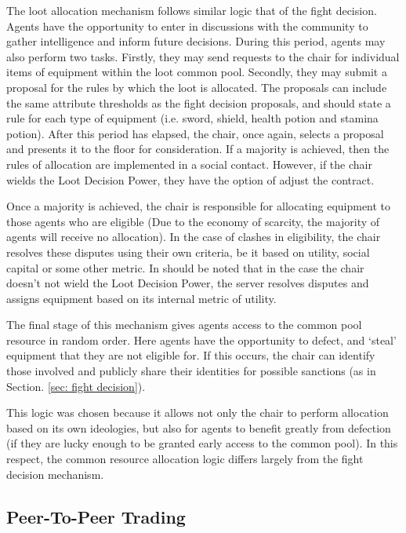 % 
The loot allocation mechanism follows similar logic that of the fight decision. Agents have the opportunity to enter in discussions with the community to gather intelligence and inform future decisions. During this period, agents may also perform two tasks. Firstly, they may send requests to the chair for individual items of equipment within the loot common pool. Secondly, they may submit a proposal for the rules by which the loot is allocated. The proposals can include the same attribute thresholds as the fight decision proposals, and should state a rule for each type of equipment (i.e. sword, shield, health potion and stamina potion). After this period has elapsed, the chair, once again, selects a proposal and presents it to the floor for consideration. If a majority is achieved, then the rules of allocation are implemented in a social contact. However, if the chair wields the Loot Decision Power, they have the option of adjust the contract. 

Once a majority is achieved, the chair is responsible for allocating equipment to those agents who are eligible (Due to the economy of scarcity, the majority of agents will receive no allocation). In the case of clashes in eligibility, the chair resolves these disputes using their own criteria, be it based on utility, social capital or some other metric. In should be noted that in the case the chair doesn't not wield the Loot Decision Power, the server resolves disputes and assigns equipment based on its internal metric of utility. 

The final stage of this mechanism gives agents access to the common pool resource in random order. Here agents have the opportunity to defect, and `steal' equipment that they are not eligible for. If this occurs, the chair can identify those involved and publicly share their identities for possible sanctions (as in Section. \ref{sec: fight decision}). 

This logic was chosen because it allows not only the chair to perform allocation based on its own ideologies, but also for agents to benefit greatly from defection (if they are lucky enough to be granted early access to the common pool). In this respect, the common resource allocation logic differs largely from the fight decision mechanism. 

\subsection{Peer-To-Peer Trading}\label{sec: trading}

